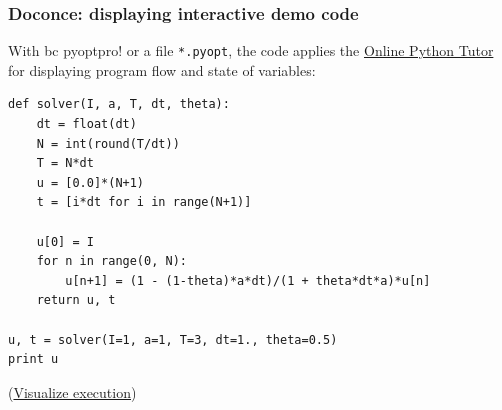 \documentclass{beamer}
\begin{document}
\begin{frame}
\frametitle{Doconce: displaying interactive demo code}

\label{slide:pot}

With \Verb!!bc pyoptpro! or a file \Verb!*.pyopt!, the code applies the
\href{{http://pythontutor.com}}{Online Python Tutor} for displaying
program flow and state of variables:

\begin{verbatim}
def solver(I, a, T, dt, theta):
    dt = float(dt)
    N = int(round(T/dt))
    T = N*dt
    u = [0.0]*(N+1)
    t = [i*dt for i in range(N+1)]

    u[0] = I
    for n in range(0, N):
        u[n+1] = (1 - (1-theta)*a*dt)/(1 + theta*dt*a)*u[n]
    return u, t

u, t = solver(I=1, a=1, T=3, dt=1., theta=0.5)
print u
\end{verbatim}
\noindent
(\href{{http://pythontutor.com/visualize.html\#code=def+solver\%28I\%2C+a\%2C+T\%2C+dt\%2C+theta\%29\%3A\%0A++++dt+\%3D+float\%28dt\%29\%0A++++N+\%3D+int\%28round\%28T\%2Fdt\%29\%29\%0A++++T+\%3D+N\%2Adt\%0A++++u+\%3D+\%5B0.0\%5D\%2A\%28N\%2B1\%29\%0A++++t+\%3D+\%5Bi\%2Adt+for+i+in+range\%28N\%2B1\%29\%5D\%0A\%0A++++u\%5B0\%5D+\%3D+I\%0A++++for+n+in+range\%280\%2C+N\%29\%3A\%0A++++++++u\%5Bn\%2B1\%5D+\%3D+\%281+-+\%281-theta\%29\%2Aa\%2Adt\%29\%2F\%281+\%2B+theta\%2Adt\%2Aa\%29\%2Au\%5Bn\%5D\%0A++++return+u\%2C+t\%0A\%0Au\%2C+t+\%3D+solver\%28I\%3D1\%2C+a\%3D1\%2C+T\%3D3\%2C+dt\%3D1.\%2C+theta\%3D0.5\%29\%0Aprint+u&mode=display&cumulative=false&heapPrimitives=false&drawParentPointers=false&textReferences=false&py=2&curInstr=0}}{Visualize execution})
\end{frame}
\end{document}
